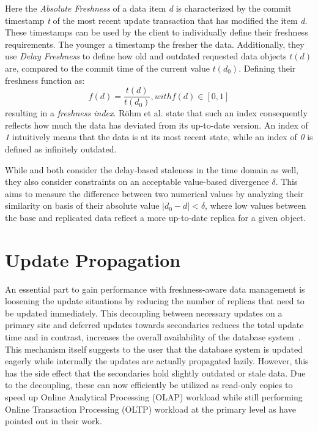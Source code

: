 Here the \textit{Absolute Freshness} of a data item \textit{d} is characterized by the commit timestamp \textit{t} 
of the most recent update transaction that has modified the item \textit{d}.
These timestamps can be used by the client to individually define their freshness requirements. The younger a timestamp the fresher the data.
Additionally, they use \textit{Delay Freshness} to define how old and outdated requested data objects $t(d)$ are, compared to the commit time of the current value $t(d_0)$.
Defining their freshness function as:
\begin{equation}
    f(d) = \frac{t(d)}{t(d_0)},  with f(d) \in [0,1]
\end{equation} 
resulting in a \emph{freshness index}.
Röhm et al. \cite{rohm:2002} state that such an index consequently reflects how much the data has deviated from its up-to-date version.
An index of \emph{1} intuitively means that the data is at its most recent state, while an index of \emph{0} is defined as infinitely outdated.

While \cite{xiang:2008} and \cite{fekete:2018} both consider the delay-based staleness in the time domain as well, they also consider constraints on 
an acceptable value-based divergence $\delta$. This aims to measure the difference between two numerical values by analyzing their similarity on basis of their 
absolute value $|d_0 - d| < \delta $, where low values between the base and replicated data reflect a more up-to-date replica for a given object.




\section{Update Propagation}
\label{r:replication}
An essential part to gain performance with freshness-aware data management is loosening the update situations by reducing the number of 
replicas that need to be updated immediately. This decoupling between necessary updates on a primary site and deferred updates towards secondaries 
reduces the total update time and in contrast, increases the overall availability of the database system~\cite{quorums:2003}.
This mechanism itself suggests to the user that the database system is updated eagerly while internally the updates are actually propagated lazily. 
However, this has the side effect that the secondaries hold slightly outdated or stale data.
Due to the decoupling, these can now efficiently be utilized as read-only copies to speed up Online Analytical Processing (OLAP) workload while still performing 
Online Transaction Processing (OLTP) workload
at the primary level as \cite{psaroudakis:2015, rohm:2002, xiang:2008} have pointed out in their work.

